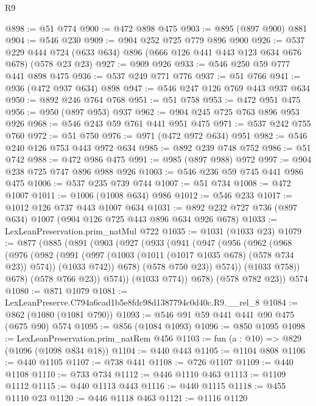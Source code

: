 \begin{lexlean}{R9}
\begin{coremodule}
@898 := @51 @774
@900 := @472 @898 @475
@903 := @895 (@897 @900) @881
@904 := @546 @230
@909 := @904 @252 @725 @779 @896 @900
@926 := @537
    @229
    @444
    @724
    (@633 @634)
    @896
    (@666 @126 @441 @443 @123 @634 @676 @678)
    (@578 @23 @23)
@927 := @909 @926
@933 := @546 @250 @59 @777 @441 @898 @475
@936 := @537 @249 @771 @776
@937 := @51 @766
@941 := @936 (@472 @937 @634) @898
@947 := @546 @247 @126 @769 @443 @937 @634
@950 := @892 @246 @764 @768
@951 := @51 @758
@953 := @472 @951 @475
@956 := @950 (@897 @953) @937
@962 := @904 @245 @725 @763 @896 @953 @926
@968 := @546 @243 @59 @761 @441 @951 @475
@971 := @537 @242 @755 @760
@972 := @51 @750
@976 := @971 (@472 @972 @634) @951
@982 := @546 @240 @126 @753 @443 @972 @634
@985 := @892 @239 @748 @752
@986 := @51 @742
@988 := @472 @986 @475
@991 := @985 (@897 @988) @972
@997 := @904 @238 @725 @747 @896 @988 @926
@1003 := @546 @236 @59 @745 @441 @986 @475
@1006 := @537 @235 @739 @744
@1007 := @51 @734
@1008 := @472 @1007
@1011 := @1006 (@1008 @634) @986
@1012 := @546 @233
@1017 := @1012 @126 @737 @443 @1007 @634
@1031 := @892 @232 @727 @736 (@897 @634) @1007 (@904 @126 @725 @443 @896 @634 @926 @678)
@1033 := LexLeanPreservation.prim_natMul @722
@1035 := @1031 (@1033 @23)
@1079 := @877
    (@885
      (@891
        (@903
          (@927
            (@933
              (@941
                (@947
                  (@956
                    (@962
                      (@968
                        (@976
                          (@982
                            (@991
                              (@997 (@1003 (@1011 (@1017 @1035 @678) (@578 @734 @23)) @574))
                              (@1033 @742))
                            @678)
                          (@578 @750 @23))
                        @574))
                    (@1033 @758))
                  @678)
                (@578 @766 @23))
              @574))
          (@1033 @774))
        @678)
      (@578 @782 @23))
    @574
@1080 := @871 @1079
@1081 := LexLeanPreserve.C794a6cad1b5e8fdc98d1387794c0d40c.R9.__rel_8
@1084 := @862 (@1080 (@1081 @790))
@1093 := @546 @91 @59 @441 @441 @90 @475 (@675 @90) @574
@1095 := @856 (@1084 @1093)
@1096 := @850 @1095
@1098 := LexLeanPreservation.prim_natRem @456
@1103 := fun (a : @10) => @829 (@1096 (@1098 @834 @18))
@1104 := @440 @443
@1105 := @1104 @808
@1106 := @440 @1105
@1107 := @738 @441
@1108 := @726 @1107
@1109 := @440 @1108
@1110 := @733 @734
@1112 := @446 @1110 @463
@1113 := @1109 @1112
@1115 := @440 @1113 @443
@1116 := @440 @1115
@1118 := @455 @1110 @23
@1120 := @446 @1118 @463
@1121 := @1116 @1120

\end{coremodule}
\end{lexlean}
